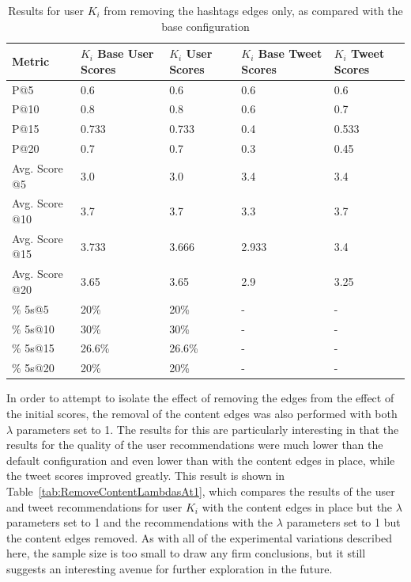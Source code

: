 \begin{table}
\centering
\begin{tabular}{l|p{2.2cm}|p{2.2cm}|p{2.2cm}|p{2.2cm}}
{\bf Metric} & {\bf $K_{i}$ Base User Scores} & {\bf $K_{i}$ User Scores} & {\bf $K_{i}$ Base Tweet Scores} & {\bf $K_{i}$ Tweet Scores} \\ \hline
P@5   & 0.6 & 0.6 & 0.6 & 0.6 \\ \hline
P@10 & 0.8 & 0.8 & 0.6 & 0.7 \\ \hline
P@15 & 0.733 & 0.733 & 0.4 & 0.533 \\ \hline
P@20 & 0.7 & 0.7 & 0.3 & 0.45 \\ \hline

Avg. Score @5   & 3.0 & 3.0 & 3.4 & 3.4 \\ \hline
Avg. Score @10 & 3.7 & 3.7 & 3.3 & 3.7 \\ \hline
Avg. Score @15 & 3.733 & 3.666 & 2.933 & 3.4 \\ \hline
Avg. Score @20 & 3.65 & 3.65 & 2.9 & 3.25 \\ \hline

\% 5s@5    & 20\% & 20\% & - & - \\ \hline
\% 5s@10  & 30\% & 30\% & - & - \\ \hline
\% 5s@15  & 26.6\% & 26.6\% & - & - \\ \hline
\% 5s@20  & 20\% & 20\% & - & - \\

\end{tabular}
\caption[Results of removing hashtag edges only]{Results for user $K_{i}$ from removing the hashtags edges only, as compared with the base configuration}
\label{tab:RemoveHashtags}
\end{table}


In order to attempt to isolate the effect of removing the edges from the effect of the initial scores, the removal of the content edges was also performed with both $\lambda$ parameters set to 1. The results for this are particularly interesting in that the results for the quality of the user recommendations were much lower than the default configuration and even lower than with the content edges in place, while the tweet scores improved greatly. This result is shown in Table~\ref{tab:RemoveContentLambdasAt1}, which compares the results of the user and tweet recommendations for user $K_{i}$ with the content edges in place but the $\lambda$ parameters set to 1 and the recommendations with the $\lambda$ parameters set to 1 but the content edges removed. As with all of the experimental variations described here, the sample size is too small to draw any firm conclusions, but it still suggests an interesting avenue for further exploration in the future.


